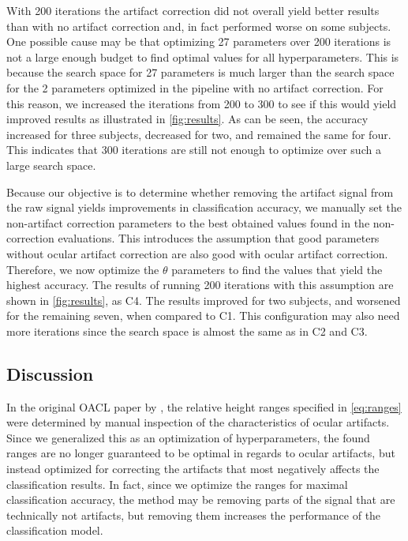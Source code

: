 With 200 iterations the artifact correction did not overall yield better results than with no artifact correction and, in fact performed worse on some subjects. One possible cause may be that optimizing 27 parameters over 200 iterations is not a large enough budget to find optimal values for all hyperparameters. This is because the search space for 27 parameters is much larger than the search space for the 2 parameters optimized in the pipeline with no artifact correction. For this reason, we increased the iterations from 200 to 300 to see if this would yield improved results as illustrated in \cref{fig:results}. As can be seen, the accuracy increased for three subjects, decreased for two, and remained the same for four. This indicates that 300 iterations are still not enough to optimize over such a large search space.

Because our objective is to determine whether removing the artifact signal from the raw signal yields improvements in classification accuracy, we manually set the non-artifact correction parameters to the best obtained values found in the non-correction evaluations. This introduces the assumption that good parameters without ocular artifact correction are also good with ocular artifact correction. Therefore, we now optimize the $\theta$ parameters to find the values that yield the highest accuracy. The results of running 200 iterations with this assumption are shown in \cref{fig:results}, as C4. The results improved for two subjects, and worsened for the remaining seven, when compared to C1. This configuration may also need more iterations since the search space is almost the same as in C2 and C3.

\subsection{Discussion}\label{sec:discussion}
In the original OACL paper by \citep{li2015ocular}, the relative height ranges specified in \cref{eq:ranges} were determined by manual inspection of the characteristics of ocular artifacts. Since we generalized this as an optimization of hyperparameters, the found ranges are no longer guaranteed to be optimal in regards to ocular artifacts, but instead optimized for correcting the artifacts that most negatively affects the classification results. In fact, since we optimize the ranges for maximal classification accuracy, the method may be removing parts of the signal that are technically not artifacts, but removing them increases the performance of the classification model.

